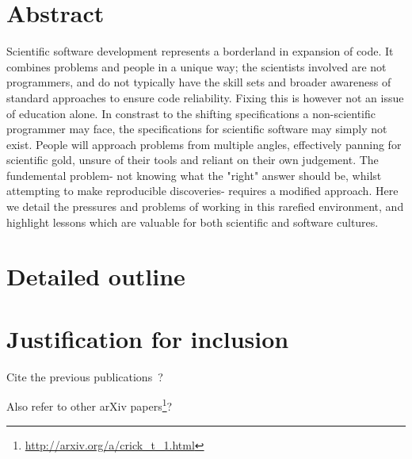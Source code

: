 \documentclass[a4paper,11pt]{article}
\begin{document}
\section*{Abstract}

Scientific software development represents a borderland in expansion
of code. It combines problems and people in a unique way; the scientists
involved are not programmers, and do not typically have the skill sets
and broader awareness of standard approaches to ensure code reliability.
Fixing this is however not an issue of education alone. In constrast to 
the shifting specifications a non-scientific programmer may face, the 
specifications for scientific software may simply not exist. People 
will approach problems from multiple angles, effectively panning for 
scientific gold, unsure of their tools and reliant on their own judgement.
The fundemental problem- not knowing what the "right" answer should be, 
whilst attempting to make reproducible discoveries- requires a modified 
approach. Here we detail the pressures and problems of working in this 
rarefied environment, and highlight lessons which are valuable for 
both scientific and software cultures.

\section*{Detailed outline}

\section*{Justification for inclusion}

Cite the previous
publications~\cite{crick-et-al_wssspe2,crick-et-al_recomp2014,crick-et-al_jors,crick-et-al_cse2015}?

Also refer to other arXiv papers\footnote{\url{http://arxiv.org/a/crick_t_1.html}}?




\end{document}

